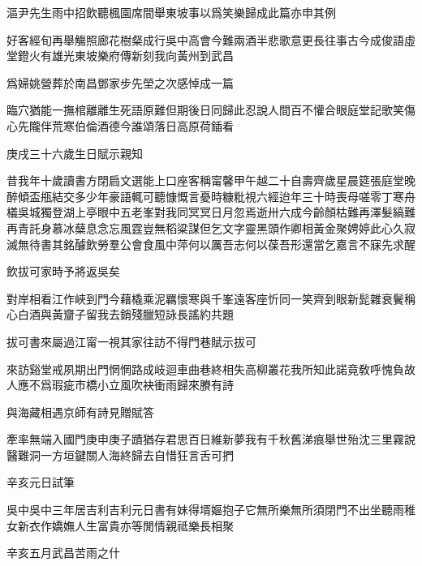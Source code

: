 \documentclass{zhvt-classic-Miya}
\begin{document}
\begin{fw}漚尹先生雨中招飲聽楓園席間舉東坡事以爲笑樂歸成此篇亦申其例\end{fw}

好客經旬再舉觴照廊花樹粲成行吳中高會今難兩酒半悲歌意更長往事古今成俊語虛堂鐙火有雄光東坡樂府傳新刻我向黃州到武昌

\begin{fw}爲婦姚營葬於南昌鄧家步先塋之次感悼成一篇\end{fw}

臨穴猶能一撫棺離離生死語原難但期後日同歸此忍說人間百不懽合眼庭堂記歌笑傷心先隴伴荒寒伯倫酒德今誰頌落日高原荷鍤看

\begin{fw}庚戌三十六歲生日賦示親知\end{fw}

昔我年十歲讀書方閉扃文選能上口座客稱甯馨甲午越二十自壽齊歲星晨筵張庭堂晚醉傾盃甁結交多少年豪語輒可聽慷慨言憂時糠粃視六經迨年三十時喪母嗟零丁寒舟檥吳城獨登湖上亭眼中五老峯對我同冥冥日月忽焉逝卅六成今齡顏枯難再澤髮縞難再青託身慕冰蘖息念忘風霆豈無稻粱謀但乞文字靈黑頭作卿相黃金聚娉婷此心久寂滅無待書其銘醵飲勞羣公會食風中萍何以厲吾志何以葆吾形還當乞嘉言不寐先求醒

\begin{fw}飲拔可家時予將返吳矣\end{fw}

對岸相看江作峽到門今藉橇乘泥羈懷寒與千峯遠客座忻同一笑齊到眼新髭雜衰鬢稱心白酒與黃齏子留我去銷殘臘短詠長謠約共題

\begin{fw}拔可書來屬過江甯一視其家往訪不得門巷賦示拔可\end{fw}

來訪谿堂戒夙期出門惘惘路成岐迴車曲巷終相失高柳叢花我所知此諾竟敎呼愧負故人應不爲瑕疵市橋小立風吹袂衝雨歸來賸有詩

\begin{fw}與海藏相遇京師有詩見贈賦答\end{fw}

牽率無端入國門庚申庚子蹟猶存君思百日維新夢我有千秋舊涕痕舉世殆沈三里霧說醫難洞一方垣鍵關人海終歸去自惜狂言舌可捫

\begin{fw}辛亥元日試筆\end{fw}

吳中吳中三年居吉利吉利元日書有妹得壻嫗抱子它無所樂無所須閉門不出坐聽雨稚女新衣作嬌嫵人生富貴亦等閒情親祗樂長相聚

\begin{fw}辛亥五月武昌苦雨之什\end{fw}
\end{document}
